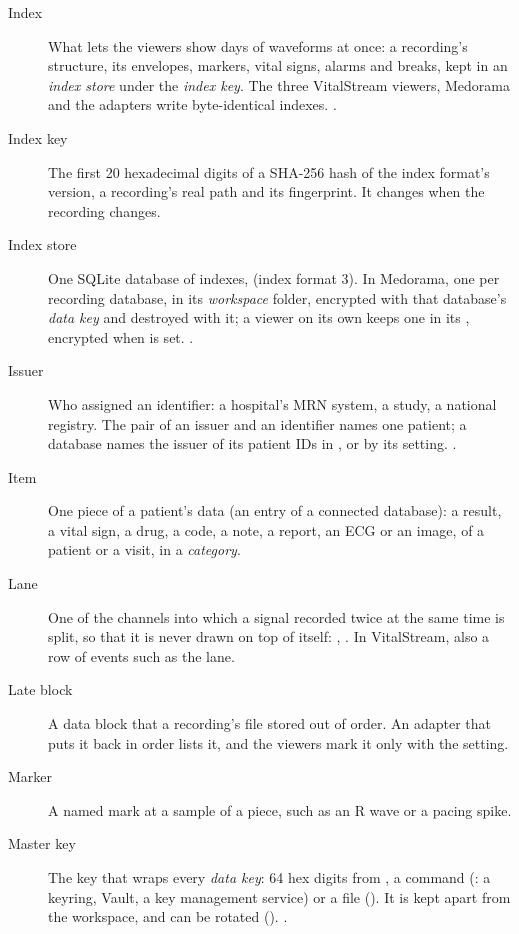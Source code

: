 \begin{description}
\item[Index] What lets the viewers show days of waveforms at once: a recording's structure, its
  envelopes, markers, vital signs, alarms and breaks, kept in an \textit{index store} under the
  \textit{index key}. The three VitalStream viewers, Medorama and the adapters write
  byte-identical indexes. .
\item[Index key] The first 20 hexadecimal digits of a SHA-256 hash of the index format's version,
  a recording's real path and its fingerprint. It changes when the recording changes.
\item[Index store] One SQLite database of indexes,  (index format 3). In
  Medorama, one per recording database, in its \textit{workspace} folder, encrypted with that
  database's \textit{data key} and destroyed with it; a viewer on its own keeps one in its
  , encrypted when  is set.
  .
\item[Issuer] Who assigned an identifier: a hospital's MRN system, a study, a national registry.
  The pair of an issuer and an identifier names one patient; a database names the issuer of its
  patient IDs in , or by its  setting.
  .
\item[Item] One piece of a patient's data (an entry of a connected database): a result, a vital
  sign, a drug, a code, a note, a report, an ECG or an image, of a patient or a visit, in a
  \textit{category}.
\item[Lane] One of the channels into which a signal recorded twice at the same time is split, so
  that it is never drawn on top of itself: , . In VitalStream, also a row of
  events such as the  lane.
\item[Late block] A data block that a recording's file stored out of order. An adapter that puts
  it back in order lists it, and the viewers mark it only with the  setting.
\item[Marker] A named mark at a sample of a piece, such as an R wave or a pacing spike.
\item[Master key] The key that wraps every \textit{data key}: 64 hex digits from
  , a command (: a keyring, Vault, a key
  management service) or a file (). It is kept apart from the workspace,
  and can be rotated (). .

\end{description}
